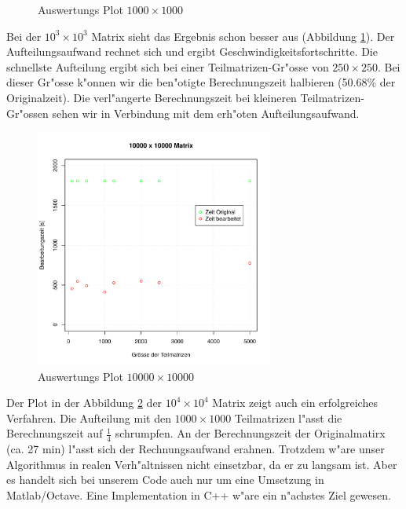 \begin{refsection}
\begin{figure}
\begin{center}
\end{center}
\caption{Auswertungs Plot $1000\times1000$}
\label{qq}
\end{figure}
Bei der $10^3\times10^3$ Matrix sieht das Ergebnis schon besser aus (Abbildung \ref{qq}). Der Aufteilungsaufwand rechnet sich und ergibt Geschwindigkeitsfortschritte. Die schnellste Aufteilung ergibt sich bei einer Teilmatrizen-Gr"osse von $250\times250$. Bei dieser Gr"osse k"onnen wir die ben"otigte Berechnungszeit halbieren (50.68\% der Originalzeit). Die verl"angerte Berechnungszeit bei kleineren Teilmatrizen-Gr"ossen sehen wir in Verbindung mit dem erh"oten Aufteilungsaufwand.
\begin{figure}
\begin{center}
\includegraphics[width=0.7\textwidth]{./mapreduce/PC10000.pdf}
\end{center}
\caption{Auswertungs Plot $10000\times10000$}
\label{qqq}
\end{figure}
Der Plot in der Abbildung \ref{qqq} der $10^4\times10^4$ Matrix zeigt auch ein erfolgreiches Verfahren. Die Aufteilung mit den $1000\times1000$ Teilmatrizen l"asst die Berechnungszeit auf $\frac{1}{4}$ schrumpfen.
An der Berechnungszeit der Originalmatirx (ca. 27 min) l"asst sich der Rechnungsaufwand erahnen. Trotzdem w"are unser Algorithmus in realen Verh"altnissen nicht einsetzbar, da er zu langsam ist. Aber es handelt sich bei unserem Code auch nur um eine Umsetzung in Matlab/Octave. Eine Implementation in C++ w"are ein n"achstes Ziel gewesen.

\end{refsection}
